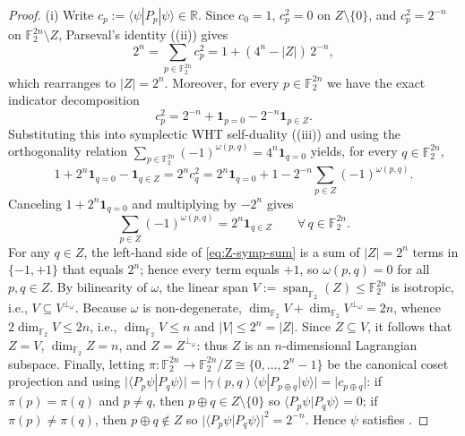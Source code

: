 \documentclass[11pt,a4paper]{article}
\theoremstyle{plain}
\theoremstyle{definition}
\theoremstyle{remark}
\newcommand{\R}{\mathbb{R}}
\newcommand{\F}{\mathbb{F}}
\newcommand{\spanF}{\operatorname{span}}
\newcommand{\braket}[2]{\langle#1|#2\rangle}
\newcommand{\expval}[2]{\langle#1|#2|#1\rangle}
\newcommand{\abs}[1]{\lvert#1\rvert}
\newcommand{\indic}[1]{\mathbf{1}_{#1}}
\numberwithin{equation}{section}
\begin{document}
\begin{proof}
(i) Write $c_p := \expval{\psi}{P_p} \in \R$. Since $c_0 = 1$, $c_p^2 = 0$ on $Z \setminus \{0\}$, and $c_p^2 = 2^{-n}$ on $\F_2^{2n} \setminus Z$, Parseval's identity ((ii)) gives
\[
  2^n = \sum_{p \in \F_2^{2n}} c_p^2 = 1 + (4^n - \abs{Z})\,2^{-n},
\]
which rearranges to $\abs{Z} = 2^n$. Moreover, for every $p \in \F_2^{2n}$ we have the exact indicator decomposition
\[
  c_p^2 = 2^{-n} + \indic{p = 0} - 2^{-n}\indic{p \in Z}.
\]
Substituting this into symplectic WHT self-duality ((iii)) and using the orthogonality relation $\sum_{p \in \F_2^{2n}} (-1)^{\omega(p, q)} = 4^n \indic{q = 0}$ yields, for every $q \in \F_2^{2n}$,
\[
  1 + 2^n\indic{q = 0} - \indic{q \in Z}
  = 2^n c_q^2
  = 2^n\indic{q = 0} + 1 - 2^{-n}\sum_{p \in Z} (-1)^{\omega(p, q)}.
\]
Canceling $1 + 2^n\indic{q = 0}$ and multiplying by $-2^n$ gives
\begin{equation}\label{eq:Z-symp-sum}
  \sum_{p \in Z} (-1)^{\omega(p, q)} = 2^n\indic{q \in Z} \qquad \forall\, q \in \F_2^{2n}.
\end{equation}
For any $q \in Z$, the left-hand side of \eqref{eq:Z-symp-sum} is a sum of $\abs{Z} = 2^n$ terms in $\{-1, +1\}$ that equals $2^n$; hence every term equals $+1$, so $\omega(p, q) = 0$ for all $p, q \in Z$. By bilinearity of $\omega$, the linear span $V := \spanF_{\F_2}(Z) \le \F_2^{2n}$ is isotropic, i.e., $V \subseteq V^{\perp_\omega}$. Because $\omega$ is non-degenerate, $\dim_{\F_2} V + \dim_{\F_2} V^{\perp_\omega} = 2n$, whence $2\dim_{\F_2} V \le 2n$, i.e., $\dim_{\F_2} V \le n$ and $\abs{V} \le 2^n = \abs{Z}$. Since $Z \subseteq V$, it follows that $Z = V$, $\dim_{\F_2} Z = n$, and $Z = Z^{\perp_\omega}$: thus $Z$ is an $n$-dimensional Lagrangian subspace. Finally, letting $\pi : \F_2^{2n} \to \F_2^{2n}/Z \cong \{0, \dots, 2^n - 1\}$ be the canonical coset projection and using $\abs{\braket{P_p\psi}{P_q\psi}} = \abs{\gamma(p, q)\expval{\psi}{P_{p \oplus q}}} = \abs{c_{p \oplus q}}$: if $\pi(p) = \pi(q)$ and $p \neq q$, then $p \oplus q \in Z \setminus \{0\}$ so $\braket{P_p\psi}{P_q\psi} = 0$; if $\pi(p) \neq \pi(q)$, then $p \oplus q \notin Z$ so $\abs{\braket{P_p\psi}{P_q\psi}}^2 = 2^{-n}$. Hence $\psi$ satisfies .


\end{proof}
\end{document}
